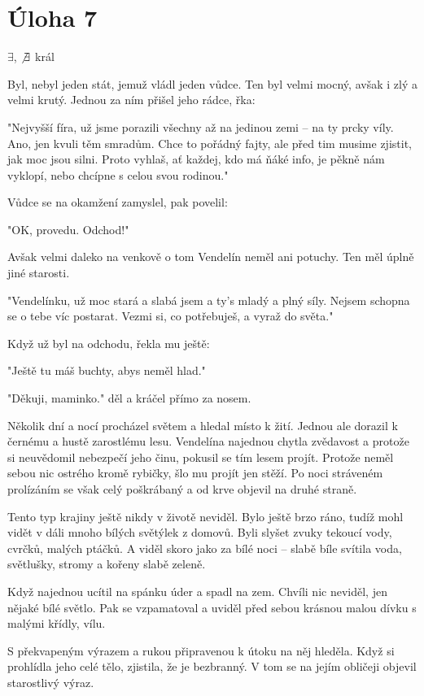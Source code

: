 \documentclass{fkssolpub}
\author{Ondřej Sedláček}
\begin{document}
 

\section{Úloha 7}

$\exists$, $\not\exists$ král

Byl, nebyl jeden stát, jemuž vládl jeden vůdce. Ten byl velmi mocný,
avšak i zlý a velmi krutý. Jednou za ním přišel jeho rádce, řka:

"Nejvyšší fíra, už jsme porazili všechny až na jedinou zemi -- na
ty prcky víly. Ano, jen kvuli těm smradům. Chce to pořádný fajty,
ale před tim musime zjistit, jak moc jsou silni. Proto vyhlaš, ať každej, 
kdo má ňáké info, je pěkně nám vyklopí, nebo chcípne s celou svou
rodinou."

Vůdce se na okamžení zamyslel, pak povelil:

"OK, provedu. Odchod!"

Avšak velmi daleko na venkově o tom Vendelín neměl ani potuchy. Ten
měl úplně jiné starosti.

"Vendelínku, už moc stará a slabá jsem a ty's mladý a plný síly. Nejsem
schopna se o tebe víc postarat. Vezmi si, co potřebuješ, a vyraž do
světa."

Když už byl na odchodu, řekla mu ještě:

"Ještě tu máš buchty, abys neměl hlad."

"Děkuji, maminko." děl a kráčel přímo za nosem.

Několik dní a nocí procházel světem a hledal místo k žití. Jednou ale
dorazil k černému a hustě zarostlému lesu. Vendelína najednou chytla 
zvědavost a protože si neuvědomil nebezpečí jeho činu, pokusil se 
tím lesem projít. Protože neměl sebou nic ostrého kromě rybičky, šlo
mu projít jen stěží. Po noci stráveném prolízáním se však celý 
poškrábaný a od krve objevil na druhé straně.

Tento typ krajiny ještě nikdy v životě neviděl. Bylo ještě brzo ráno,
tudíž mohl vidět v dáli mnoho bílých světýlek z domovů. Byli slyšet
zvuky tekoucí vody, cvrčků, malých ptáčků. A viděl skoro jako za bílé
noci -- slabě bíle svítila voda, světlušky, stromy a kořeny slabě 
zeleně.

Když najednou ucítil na spánku úder a spadl na zem. Chvíli nic neviděl,
jen nějaké bílé světlo. Pak se vzpamatoval a uviděl před sebou krásnou
malou dívku s malými křídly, vílu.

S překvapeným výrazem a rukou připravenou k útoku na něj hleděla.
Když si prohlídla jeho celé tělo, zjistila, že je bezbranný. V tom
se na jejím obličeji objevil starostlivý výraz.
\end{document}
